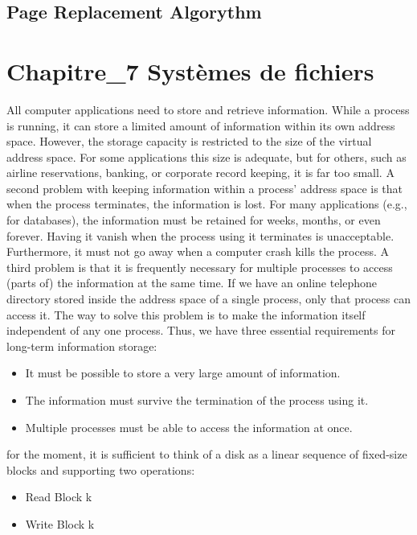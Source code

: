 \subsection{Page Replacement Algorythm}
\newpage
\section{Chapitre\_7 Systèmes de fichiers}%

All computer applications need to store and retrieve information. While a process is running, it can store a limited amount of information within its own address space. However, the storage capacity is restricted to the size of the virtual address space. For some applications this size is adequate, but for others, such as airline reservations, banking, or corporate record keeping, it is far too small. A second problem with keeping information within a process’ address space is that when the process terminates, the information is lost. For many applications (e.g., for databases), the information must be retained for weeks, months, or even forever. Having it vanish when the process using it terminates is unacceptable. Furthermore, it must not go away when a computer crash kills the process. A third problem is that it is frequently necessary for multiple processes to access (parts of) the information at the same time. If we have an online telephone directory stored inside the address space of a single process, only that process can access it. The way to solve this problem is to make the information itself independent of any one process. Thus, we have three essential requirements for long-term information storage:
\begin{itemize}
    \item It must be possible to store a very large amount of information.
    \item The information must survive the termination of the process using it.
    \item Multiple processes must be able to access the information at once.
\end{itemize}
for the moment, it is sufficient to think of a disk as a linear sequence of fixed-size blocks and supporting two operations:
\begin{itemize}
    \item Read Block k
    \item Write Block k
\end{itemize}

